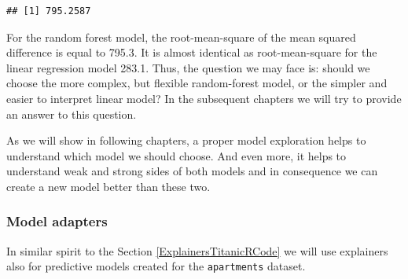\documentclass[12pt,]{krantz}
\newenvironment{Shaded}{\begin{snugshade}}{\end{snugshade}}
\newcommand{\DataTypeTok}[1]{\textcolor[rgb]{0.13,0.29,0.53}{#1}}
\newcommand{\KeywordTok}[1]{\textcolor[rgb]{0.13,0.29,0.53}{\textbf{#1}}}
\newcommand{\NormalTok}[1]{#1}
\newcommand{\OperatorTok}[1]{\textcolor[rgb]{0.81,0.36,0.00}{\textbf{#1}}}
\newcommand{\StringTok}[1]{\textcolor[rgb]{0.31,0.60,0.02}{#1}}
\begin{document}
\begin{verbatim}
## [1] 795.2587
\end{verbatim}

For the random forest model, the root-mean-square of the mean squared difference is equal to 795.3. It is almost identical as root-mean-square for the linear regression model 283.1. Thus, the question we may face is: should we choose the more complex, but flexible random-forest model, or the simpler and easier to interpret linear model? In the subsequent chapters we will try to provide an answer to this question.

As we will show in following chapters, a proper model exploration helps to understand which model we should choose. And even more, it helps to understand weak and strong sides of both models and in consequence we can create a new model better than these two.

\hypertarget{ExplainersApartmentsRCode}{%
\subsubsection{Model adapters}\label{ExplainersApartmentsRCode}}

In similar spirit to the Section \ref{ExplainersTitanicRCode} we will use explainers also for predictive models created for the \texttt{apartments} dataset.

\begin{Shaded}
\end{Shaded}
\end{document}
